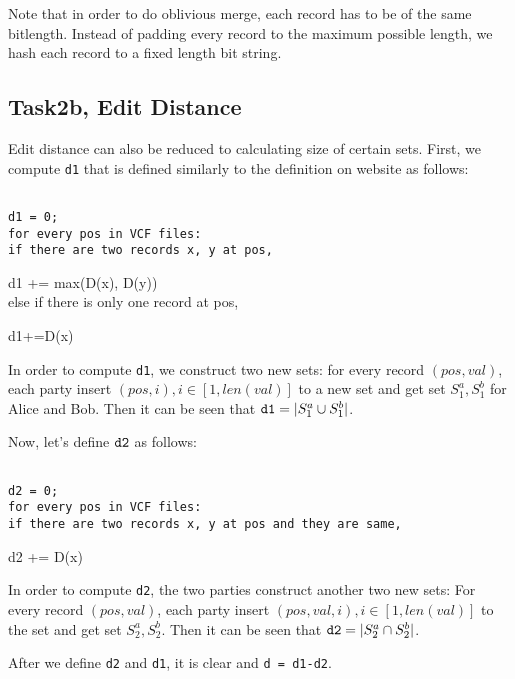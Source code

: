 Note that in order to do oblivious merge, each record has to be of the same bitlength. Instead of padding every record to the maximum possible length, we hash each
record to a fixed length bit string.
\subsection{Task2b, Edit Distance}
Edit distance can also be reduced to calculating size of certain sets. First, we compute {\tt d1} that is defined similarly to the definition on website as follows:\\
\begin{framed}
{\tt~\\
d1 = 0;\\
for every pos in VCF files:\\
if there are two records x, y at pos,

d1 += max(D(x), D(y))\\
else if there is only one record at pos,

d1+=D(x)\\}
\end{framed}

In order to compute {\tt d1}, we construct two new sets: for every record $(pos, val)$, each party insert $(pos, i), i\in[1, len(val)]$ to a new set and get set $S_1^a, S_1^b$ for Alice and Bob. Then it 
can be seen that ${\tt d1} = |S_1^a\cup S_1^b|$.

Now, let's define ${\tt d2}$ as follows:
\begin{framed}
{\tt~\\
d2 = 0;\\
for every pos in VCF files:\\
if there are two records x, y at pos and they are same,

d2 += D(x)\\}
\end{framed}
In order to compute {\tt d2}, the two parties construct another two new sets: For every record $(pos, val)$, each party insert $(pos,val, i), i\in[1, len(val)]$ to the set and get set $S_2^a, S_2^b$. Then it 
can be seen that ${\tt d2} = |S_2^a\cap S_2^b|$.

After we define {\tt d2} and {\tt d1}, it is clear and {\tt d = d1-d2}.